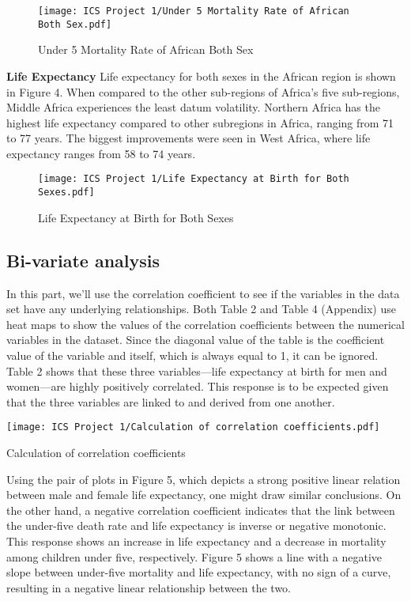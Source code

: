\documentclass[12 pt]{scrartcl}
\begin{document}
\begin{figure}[ht]
    \centering
    \texttt{[image: ICS Project 1/Under 5 Mortality Rate of African Both Sex.pdf]}
    \caption{Under 5 Mortality Rate of African Both Sex}
    \label{fig:my_label}
\end{figure}

\textbf{Life Expectancy} Life expectancy for both sexes in the African region is shown in Figure 4. When compared to the other sub-regions of Africa's five sub-regions, Middle Africa experiences the least datum volatility. Northern Africa has the highest life expectancy compared to other subregions in Africa, ranging from 71 to 77 years. The biggest improvements were seen in West Africa, where life expectancy ranges from 58 to 74 years.

\begin{figure}[ht]
    \centering
    \texttt{[image: ICS Project 1/Life Expectancy at Birth for Both Sexes.pdf]}
    \caption{Life Expectancy at Birth for Both Sexes}
    \label{fig:my_label}
\end{figure}

\newpage\subsection{Bi-variate analysis}

In this part, we'll use the correlation coefficient to see if the variables in the data set have any underlying relationships. Both Table 2 and Table 4 (Appendix) use heat maps to show the values of the correlation coefficients between the numerical variables in the dataset. Since the diagonal value of the table is the coefficient value of the variable and itself, which is always equal to 1, it can be ignored. Table 2 shows that these three variables—life expectancy at birth for men and women—are highly positively correlated. This response is to be expected given that the three variables are linked to and derived from one another.

\begin{table}[ht]
    \centering
    \texttt{[image: ICS Project 1/Calculation of correlation coefficients.pdf]}
    \caption{Calculation of correlation coefficients}
    \label{tab:my_label}
\end{table}

Using the pair of plots in Figure 5, which depicts a strong positive linear relation between male and female life expectancy, one might draw similar conclusions. On the other hand, a negative correlation coefficient indicates that the link between the under-five death rate and life expectancy is inverse or negative monotonic. This response shows an increase in life expectancy and a decrease in mortality among children under five, respectively. Figure 5 shows a line with a negative slope between under-five mortality and life expectancy, with no sign of a curve, resulting in a negative linear relationship between the two.
\end{document}
